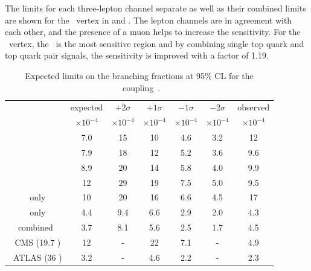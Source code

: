 The limits for each three-lepton channel separate as well as their combined limits are shown for the \Zct\ vertex in   and . The lepton channels are in agreement with each other, and the presence of a muon helps to increase the sensitivity. For the \Zct\ vertex, the \TTSR\ is the most sensitive region  and by combining single top quark and top quark pair signals, the sensitivity is improved with a factor of 1.19. 

\begin{table}[htbp]
	\centering
	\caption{Expected limits on the branching fractions at 95\% CL for the \Zct\ coupling~\cite{Sirunyan:2017kkr,ATLAS-CONF-2017-070}.}
	\begin{tabular}{ccccccc}
		\toprule
		& expected & $+2\sigma$ & $+1\sigma$ & $-1\sigma$ & $-2\sigma$ & observed \\ 
			& $\times 10^{-4}$ & $\times 10^{-4}$ & $\times 10^{-4}$ & $\times 10^{-4}$ & $\times 10^{-4}$ & $\times 10^{-4}$ \\
		
		\midrule
		\mumumu\ & 7.0  & 15  & 10  & 4.6  & 3.2  & 12  \\ 
		
		\emumu\ & 7.9  & 18  & 12  & 5.2  & 3.6  & 9.6  \\ 
		
		\eemu\ & 8.9  & 20  & 14  & 5.8  & 4.0  & 9.9  \\ 
		
		\eee\ & 12  & 29  & 19  & 7.5  & 5.0  & 9.5  \B\\ 
		\hdashline
		\STSR\ only & 10  & 20  & 16  & 6.6  & 4.5  & 17  \T \\ 
		
		\TTSR\ only & 4.4  & 9.4  & 6.6  & 2.9  & 2.0  & 4.3  \B \\ 
		\hdashline 
		combined & 3.7  & 8.1  & 5.6  & 2.5  & 1.7  & 4.5  \T\B\\ 
		\hdashline
		8 \TeV\ CMS (19.7 \fbinv)    & 12  & -  &22  & 7.1  & -  & 4.9  \T\B\\
		\hdashline
		13 \TeV\ ATLAS (36 \fbinv)    & 3.2  & -  &4.6  & 2.2 & -  & 2.3  \T\\
		\hline
	\end{tabular} 
	\label{tab:ResultsTZC}
\end{table}
